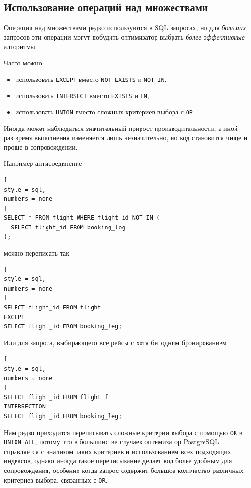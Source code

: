 \documentclass[%
	11pt,
	a4paper,
	utf8,
		]{article}
\begin{document}
\subsection{Использование операций над множествами}

Операции над множествами редко используются в SQL запросах, но для \emph{больших} запросов эти операции могут побудить оптимизатор выбрать \emph{более эффективные} алгоритмы.

Часто можно:
\begin{itemize}
	\item использовать \verb|EXCEPT| вместо \verb|NOT EXISTS| и \verb|NOT IN|,
	
	\item использовать \verb|INTERSECT| вместо \verb|EXISTS| и \verb*|IN|,
	
	\item использовать \verb|UNION| вместо сложных критериев выбора с \verb|OR|.
\end{itemize}

Иногда может наблюдаться значительный прирост производительности, а иной раз время выполнения изменяется лишь незначительно, но код становится чище и проще в сопровождении.

Например антисоединение
\begin{lstlisting}[
style = sql,
numbers = none	
]
SELECT * FROM flight WHERE flight_id NOT IN (
  SELECT flight_id FROM booking_leg
);
\end{lstlisting}
можно переписать так
\begin{lstlisting}[
style = sql,
numbers = none	
]
SELECT flight_id FROM flight
EXCEPT
SELECT flight_id FROM booking_leg;
\end{lstlisting}

Или для запроса, выбирающего все рейсы с хотя бы одним бронированием
\begin{lstlisting}[
style = sql,
numbers = none
]
SELECT flight_id FROM flight f
INTERSECTION
SELECT flight_id FROM booking_leg;
\end{lstlisting}

Нам редко приходится переписывать сложные критерии выбора с помощью \verb|OR| в \verb|UNION ALL|, потому что в большинстве случаев оптимизатор PostgreSQL справляется с анализом таких критериев и использованием всех подходящих индексов, однако иногда такое переписывание делает код более удобным для сопровождения, особенно когда запрос содержит большое количество различных критериев выбора, связанных с \verb|OR|.
\end{document}
